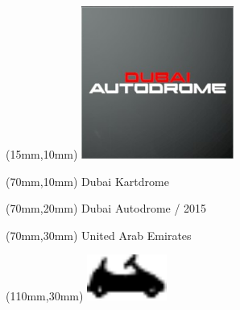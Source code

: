 \null\newpage
\begin{textblock*}{50mm}(15mm,10mm)%
\includegraphics[width=50mm]{LG/2015-05-20_00081.png}
\end{textblock*}
\begin{textblock*}{130mm}(70mm,10mm)%
{\fontsize{20}{20}\selectfont Dubai Kartdrome}\\
\end{textblock*}
\begin{textblock*}{120mm}(70mm,20mm)%
{\fontsize{16}{16}\selectfont Dubai Autodrome / 2015}\\
\end{textblock*}
\begin{textblock*}{120mm}(70mm,30mm)%
{\fontsize{12}{12}\selectfont United Arab Emirates}
\end{textblock*}
\begin{textblock*}{30mm}(110mm,30mm)%
\centering
\includegraphics[height=15mm]{icons/kart.pdf}
\end{textblock*}
